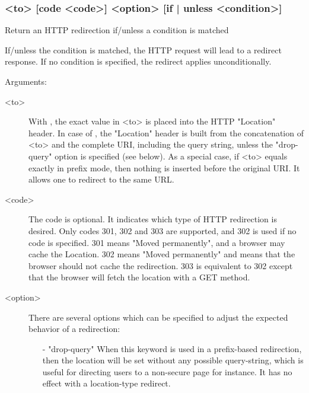 \subsubsection[redirect prefix] { <to> [code <code>] <option> [{if | unless} <condition>]}

  Return an HTTP redirection if/unless a condition is matched


  If/unless the condition is matched, the HTTP request will lead to a redirect
  response. If no condition is specified, the redirect applies unconditionally.

  Arguments:
  \begin{description}
  \item[<to>]
              With , the exact value in <to> is placed into
              the HTTP "Location" header. In case of , the
              "Location" header is built from the concatenation of <to> and the
              complete URI, including the query string, unless the "drop-query"
              option is specified (see below). As a special case, if <to>
              equals exactly \chr{/} in prefix mode, then nothing is inserted
              before the original URI. It allows one to redirect to the same
              URL.

  \item[<code>]
              The code is optional. It indicates which type of HTTP redirection
              is desired. Only codes 301, 302 and 303 are supported, and 302 is
              used if no code is specified. 301 means "Moved permanently", and
              a browser may cache the Location. 302 means "Moved permanently"
              and means that the browser should not cache the redirection. 303
              is equivalent to 302 except that the browser will fetch the
              location with a GET method.

  \item[<option>]
              There are several options which can be specified to adjust the
              expected behavior of a redirection:
      \begin{itemize}
      \item[-] "drop-query"
        When this keyword is used in a prefix-based redirection, then the
        location will be set without any possible query-string, which is useful
        for directing users to a non-secure page for instance. It has no effect
        with a location-type redirect.


\end{itemize}
\end{description}
